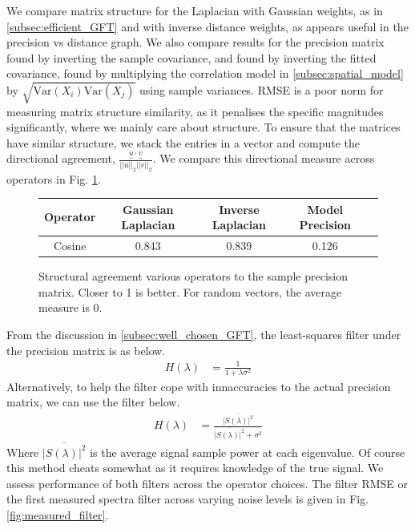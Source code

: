 \documentclass[12pt,a4paper]{article} %
\newcommand{\ve}[1]{\underset{\sim}{#1}}
\begin{document}
We compare matrix structure for the Laplacian with Gaussian weights, as in \ref{subsec:efficient_GFT} and with inverse distance weights, as appears useful in the precision vs distance graph. We also compare results for the precision matrix found by inverting the sample covariance, and found by inverting the fitted covariance, found by multiplying the correlation model in \ref{subsec:spatial_model} by $\sqrt{\text{Var}(X_i)\text{Var}(X_j)}$ using sample variances. RMSE is a poor norm for measuring matrix structure similarity, as it penalises the specific magnitudes significantly, where we mainly care about structure. To ensure that the matrices have similar structure, we stack the entries in a vector and compute the directional agreement, $\frac{\ve{u}\cdot\ve{v}}{||u||_2||v||_2}$. We compare this directional measure across operators in Fig. \ref{fig:matrix_angle}.
\begin{figure}[!ht]
    \centering
        \begin{tabular}{|c|c|c|c|c|}
         \hline
         Operator & Gaussian Laplacian & Inverse Laplacian & Model Precision \\
         \hline
         Cosine & 0.843 & 0.839 & 0.126 \\
         \hline
    \end{tabular}
    \caption{Structural agreement various operators to the sample precision matrix. Closer to 1 is better. For random vectors, the average measure is 0.}
    \label{fig:matrix_angle}
\end{figure}
From the discussion in \ref{subsec:well_chosen_GFT}, the least-squares filter under the precision matrix is as below.
\begin{align*}
    H(\lambda)&=\frac{1}{1+\lambda\sigma^2}
\end{align*}
Alternatively, to help the filter cope with innaccuracies to the actual precision matrix, we can use the filter below.
\begin{align*}
    H(\lambda)&=\frac{\overline{|S(\lambda)|^2}}{\overline{|S(\lambda)|^2}+\sigma^2}
\end{align*}
Where $\overline{|S(\lambda)|^2}$ is the average signal sample power at each eigenvalue. Of course this method cheats somewhat as it requires knowledge of the true signal. We assess performance of both filters across the operator choices. The filter RMSE or the first measured spectra filter across varying noise levels is given in Fig. \ref{fig:measured_filter}.
\end{document}
